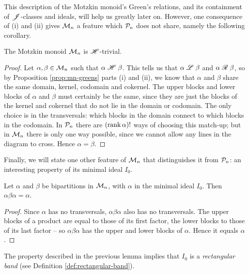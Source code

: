 This description of the Motzkin monoid's Green's relations, and its containment
of $\mathrel{\mathscr{J}}$-classes and ideals, will help us greatly later on.  However, one
consequence of (i) and (ii) gives $\mathcal{M}_n$ a feature which $\mathcal{P}_n$ does not
share, namely the following corollary.

\begin{corollary}
  \label{cor:mn-h-trivial}
  The Motzkin monoid $\mathcal{M}_n$ is $\mathrel{\mathscr{H}}$-trivial.
  \begin{proof}
    Let $\alpha, \beta \in \mathcal{M}_n$ such that $\alpha \mathrel{\mathscr{H}} \beta$.  This tells us
    that $\alpha \mathrel{\mathscr{L}} \beta$ and $\alpha \mathrel{\mathscr{R}} \beta$, so by Proposition
    \ref{prop:mn-greens} parts (i) and (ii), we know that $\alpha$ and $\beta$
    share the same domain, kernel, codomain and cokernel.  The upper blocks and
    lower blocks of $\alpha$ and $\beta$ must certainly be the same, since they
    are just the blocks of the kernel and cokernel that do not lie in the domain
    or codomain.  The only choice is in the transversals: which blocks in the
    domain connect to which blocks in the codomain.  In $\mathcal{P}_n$ there are
    $(\operatorname{rank} \alpha)!$ ways of choosing this match-up; but in $\mathcal{M}_n$ there is
    only one way possible, since we cannot allow any lines in the diagram to
    cross.  Hence $\alpha = \beta$.
  \end{proof}
\end{corollary}

Finally, we will state one other feature of $\mathcal{M}_n$ that distinguishes it from
$\mathcal{P}_n$: an interesting property of its minimal ideal $I_0$.

\begin{lemma}
  \label{lem:i0-rect-band}
  Let $\alpha$ and $\beta$ be bipartitions in $\mathcal{M}_n$, with $\alpha$ in the
  minimal ideal $I_0$.  Then $\alpha \beta \alpha = \alpha$.
  \begin{proof}
    Since $\alpha$ has no transversals, $\alpha\beta\alpha$ also has no
    transversals.  The upper blocks of a product are equal to those of its first
    factor, the lower blocks to those of its last factor -- so $\alpha\beta\alpha$
    has the upper and lower blocks of $\alpha$.  Hence it equals $\alpha$.
  \end{proof}
\end{lemma}

The property described in the previous lemma implies that $I_0$ is a
\textit{rectangular band} (see Definition \ref{def:rectangular-band}).

